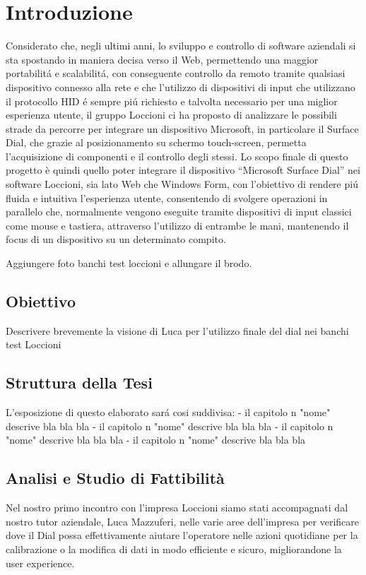 \chapter{Introduzione}
\label{chap:intro}

Considerato che, negli ultimi anni, lo sviluppo e controllo di software aziendali si sta spostando in maniera decisa verso il Web, permettendo una maggior portabilitá e scalabilitá, con conseguente controllo da remoto tramite qualsiasi dispositivo connesso alla rete e che l’utilizzo di dispositivi di input che utilizzano il protocollo HID é sempre piú richiesto e talvolta necessario per una miglior esperienza utente, il gruppo Loccioni ci ha proposto di analizzare le possibili strade da percorre per integrare un dispositivo Microsoft, in particolare il Surface Dial, che grazie al posizionamento su schermo touch-screen, permetta l’acquisizione di componenti e il controllo degli stessi.
Lo scopo finale di questo progetto è quindi quello poter integrare il dispositivo “Microsoft Surface Dial” nei software Loccioni, sia lato Web che Windows Form, con l'obiettivo di rendere piú fluida e intuitiva l’esperienza utente, consentendo di svolgere operazioni in parallelo che, normalmente vengono eseguite tramite dispositivi di input classici come mouse e tastiera, attraverso l’utilizzo di entrambe le mani, mantenendo il focus di un dispositivo su un determinato compito.

Aggiungere foto banchi test loccioni e allungare il brodo.

\section{Obiettivo}
Descrivere brevemente la visione di Luca per l'utilizzo finale del dial nei banchi test Loccioni

\section{Struttura della Tesi}
L'esposizione di questo elaborato sará cosi suddivisa:
- il capitolo n "nome" descrive bla bla bla
- il capitolo n "nome" descrive bla bla bla
- il capitolo n "nome" descrive bla bla bla
- il capitolo n "nome" descrive bla bla bla

\section{Analisi e Studio di Fattibilità}

Nel nostro primo incontro con l'impresa Loccioni siamo stati accompagnati dal nostro tutor aziendale, Luca Mazzuferi, nelle varie aree dell'impresa per verificare dove il Dial possa effettivamente aiutare l'operatore nelle azioni quotidiane per la calibrazione o la modifica di dati in modo efficiente e sicuro, migliorandone la user experience.\\

